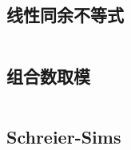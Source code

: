 \subsection{线性同余不等式}
\inputminted{cpp}{\source/number-theory/linear-inequaltion.cpp}
\subsection{组合数取模}
\inputminted{cpp}{\source/number-theory/module.cpp}
\subsection{Schreier-Sims}
\inputminted{cpp}{\source/number-theory/SchreierSims.cpp}
